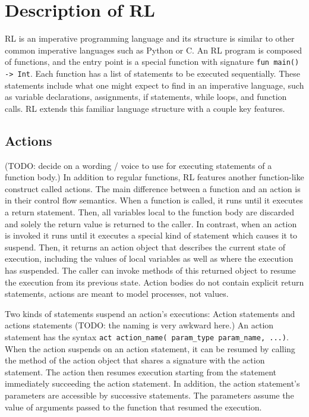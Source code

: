 \section{Description of RL}
RL is an imperative programming language and its structure is similar to other common imperative
languages such as Python or C. An RL program is composed of functions, and the entry point is a special
function with signature \texttt{fun main() -> Int}. Each function has a list of statements to be executed sequentially.
These statements include what one might expect to find in an imperative language, such as 
variable declarations, assignments, if statements, while loops, and function calls. RL extends this 
familiar language structure with a couple key features.

\subsection{Actions}
(TODO: decide on a wording / voice to use for executing statements of a function body.)
In addition to regular functions, RL features another function-like construct called actions.
The main difference between a function and an action is in their control flow semantics.
When a function is called, it runs until it executes a return statement.
Then, all variables local to the function body are discarded and solely the return value is returned to the caller.
In contrast, when an action is invoked it runs until it executes a special kind of statement which causes it to suspend.
Then, it returns an action object that describes the current state of execution, including the values of local variables as well as where the execution has suspended.
The caller can invoke methods of this returned object to resume the execution from its previous state.
Action bodies do not contain explicit return statements, actions are meant to model processes, not values.

Two kinds of statements suspend an action's executions: Action statements and actions statements (TODO: the naming is very awkward here.)
An action statement has the syntax \texttt{act action\_name( param\_type param\_name, ...)}.
When the action suspends on an action statement, it can be resumed by calling the method of the action object that shares a signature with the action statement.
The action then resumes execution starting from the statement immediately succeeding the action statement.
In addition, the action statement's parameters are accessible by successive statements.
The parameters assume the value of arguments passed to the function that resumed the execution.

